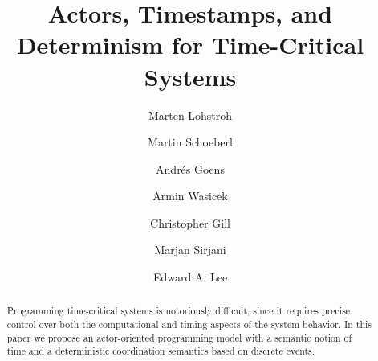 \documentclass[sigconf]{acmart}
\begin{document}
\title{Actors, Timestamps, and Determinism for Time-Critical Systems}


\author{Marten Lohstroh}


\author{Martin Schoeberl}

\author{Andr\'es Goens}
\orcid{}

\author{Armin Wasicek}
\orcid{}

\author{Christopher Gill}
\orcid{}


\author{Marjan Sirjani}
\orcid{}


\author{Edward A. Lee}



\renewcommand{\shortauthors}{M. Lohstroh et al.}

\begin{abstract}
Programming time-critical systems is notoriously difficult, since it requires precise control over both the computational and timing aspects of the system behavior. In this paper we propose an actor-oriented programming model with a semantic notion of time and a deterministic coordination semantics based on discrete events. 
\end{abstract}
\end{document}
